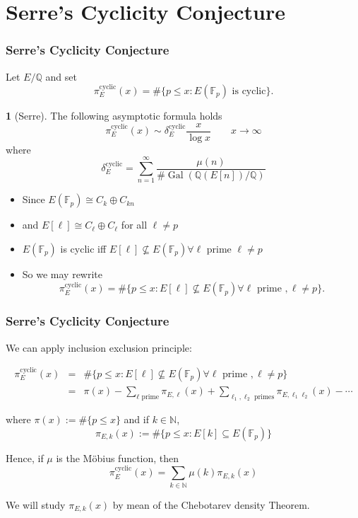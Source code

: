 \documentclass[10pt,handout]{beamer} %
\newcommand{\Q}{\mathbb Q}
\newcommand{\N}{\mathbb N}
\newcommand{\F}{\mathbb F}
\theoremstyle{definition}
\newtheorem{conj}[theorem]{\translate{Conjecture}}
\begin{document}
\section{Serre's Cyclicity Conjecture}

\begin{frame}
\frametitle{Serre's Cyclicity Conjecture}
 Let $E/\Q$ and set\pause
$$\pi_E^{\text{cyclic}}(x)=\#\{p\le x: E(\F_p)\text{ is cyclic}\}.$$\pause

\begin{conj}[Serre]
The following asymptotic formula holds
$$\pi_E^{\text{cyclic}}(x)\sim\delta_E^{\text{cyclic}}\frac x{\log x}\qquad x\rightarrow\infty$$\pause
where \vspace*{-3pt}
$$\delta_E^{\text{cyclic}}=\sum_{n=1}^\infty\frac{\mu(n)}{\#\operatorname{Gal}(\Q(E[n])/\Q)}$$
 \end{conj}\pause

\begin{itemize}[<+-| alert@+>]
 \item Since $E(\F_p)\cong C_k\oplus C_{kn}$
 \item[] and $E[\ell]\cong C_\ell\oplus C_\ell$ for all $\ell\ne p$
 \item[] $E(\F_p)$ is cyclic iff $E[\ell]\nsubseteq E(\F_p) \forall \ell$ prime  $\ell\ne p$
 \item So we may rewrite \vspace*{-3pt}
$$\pi_E^{\text{cyclic}}(x)=\#\{p\le x: E[\ell]\nsubseteq E(\F_p) \forall \ell\text{ prime }, \ell\ne p\}.$$
 \end{itemize}\pause
\end{frame}


\begin{frame}
\frametitle{Serre's Cyclicity Conjecture}

We can apply inclusion exclusion principle:\pause

\begin{align*}
 \pi_E^{\text{cyclic}}(x)&=&\#\{p\le x: E[\ell]\nsubseteq E(\F_p) \forall \ell\text{ prime }, \ell\ne p\}\\
&=&\pi(x)-\sum_{\ell\text{ prime}}\pi_{E,\ell}(x)+\sum_{\ell_1,\ell_2\text{ primes}}\pi_{E,\ell_1\ell_2}(x)-\cdots
 \end{align*}\pause
 
where $\pi(x):=\#\{p\le x\}$ and if $k\in\N$,
$$\pi_{E,k}(x):=\#\{p\le x: E[k]\subseteq E(\F_p)\}$$\pause

Hence, if $\mu$ is the M\"obius function, then
$$\pi_E^{\text{cyclic}}(x)=\sum_{k\in\N}\mu(k)\pi_{E,k}(x)$$\pause

We will study $\pi_{E,k}(x)$ by mean of the Chebotarev density Theorem.
\end{frame}
\end{document}
